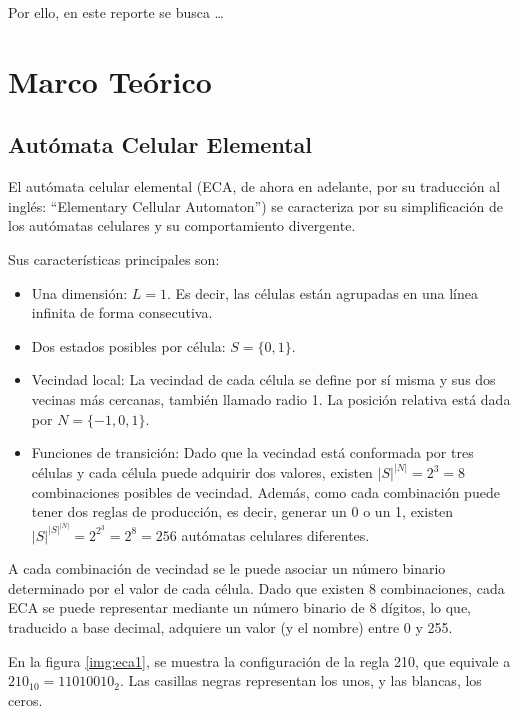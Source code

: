 \documentclass[12pt,twoside]{article}
\begin{document}
	Por ello, en este reporte se busca \dots
	
	\clearpage
	\section{Marco Teórico}
	
	\subsection{Autómata Celular Elemental}
	
	El autómata celular elemental (ECA, de ahora en adelante, por su traducción al inglés: ``Elementary Cellular Automaton'') se caracteriza por su simplificación de los autómatas celulares y su comportamiento divergente.
	
	Sus características principales son:
	
	\begin{itemize}
		\item Una dimensión: $L = 1$. Es decir, las células están agrupadas en una línea infinita de forma consecutiva.
		
		\item Dos estados posibles por célula: $S = \{0, 1\}$.  
		
		\item Vecindad local: La vecindad de cada célula se define por sí misma y sus dos vecinas más cercanas, también llamado radio 1. La posición relativa está dada por $N = \{-1, 0, 1\}$.  
		
		\item Funciones de transición: Dado que la vecindad está conformada por tres células y cada célula puede adquirir dos valores, existen $|S|^{|N|} = 2^3 = 8$ combinaciones posibles de vecindad. Además, como cada combinación puede tener dos reglas de producción, es decir, generar un 0 o un 1, existen $|S|^{|S|^{|N|}} = 2^{2^3} = 2^8 = 256$ autómatas celulares diferentes.  
		
	\end{itemize}
	
	A cada combinación de vecindad se le puede asociar un número binario determinado por el valor de cada célula. Dado que existen 8 combinaciones, cada ECA se puede representar mediante un número binario de 8 dígitos, lo que, traducido a base decimal, adquiere un valor (y el nombre) entre 0 y 255.
	
	En la figura \ref{img:eca1}, se muestra la configuración de la regla 210, que equivale a $210_{10} = 11010010_2$. Las casillas negras representan los unos, y las blancas, los ceros.
	
\end{document}
